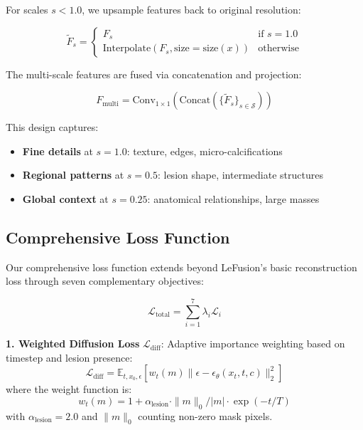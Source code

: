 \documentclass[10pt,twocolumn,letterpaper]{article}
\begin{document}
For scales $s < 1.0$, we upsample features back to original resolution:

\begin{equation}
\tilde{F}_s = \begin{cases}
F_s & \text{if } s = 1.0 \\
\text{Interpolate}(F_s, \text{size}=\text{size}(x)) & \text{otherwise}
\end{cases}
\end{equation}

The multi-scale features are fused via concatenation and projection:

\begin{equation}
F_{\text{multi}} = \text{Conv}_{1\times1}\left(\text{Concat}(\{\tilde{F}_s\}_{s \in \mathcal{S}})\right)
\end{equation}

This design captures:
\begin{itemize}
    \item \textbf{Fine details} at $s=1.0$: texture, edges, micro-calcifications
    \item \textbf{Regional patterns} at $s=0.5$: lesion shape, intermediate structures  
    \item \textbf{Global context} at $s=0.25$: anatomical relationships, large masses
\end{itemize}

\subsection{Comprehensive Loss Function}

Our comprehensive loss function extends beyond LeFusion's basic reconstruction loss through seven complementary objectives:

\begin{equation}
\mathcal{L}_{\text{total}} = \sum_{i=1}^{7} \lambda_i \mathcal{L}_i
\end{equation}

\textbf{1. Weighted Diffusion Loss} $\mathcal{L}_{\text{diff}}$: Adaptive importance weighting based on timestep and lesion presence:
\begin{equation}
\mathcal{L}_{\text{diff}} = \mathbb{E}_{t,x_0,\epsilon}\left[w_t(m) \|\epsilon - \epsilon_\theta(x_t, t, c)\|_2^2\right]
\end{equation}
where the weight function is:
\begin{equation}
w_t(m) = 1 + \alpha_{\text{lesion}} \cdot \|m\|_0 / |m| \cdot \exp(-t/T)
\end{equation}
with $\alpha_{\text{lesion}} = 2.0$ and $\|m\|_0$ counting non-zero mask pixels.
\end{document}
